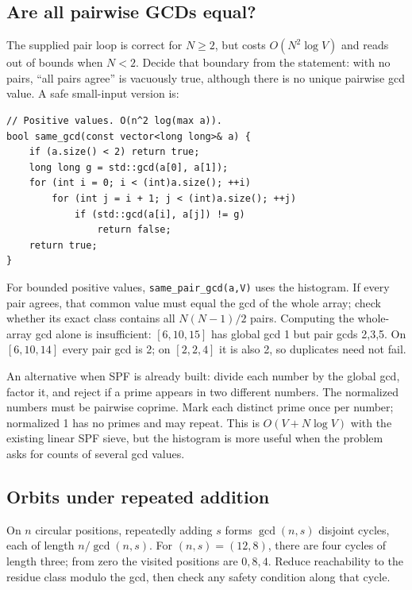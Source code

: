 \subsection{Are all pairwise GCDs equal?}
The supplied pair loop is correct for $N\ge2$, but costs
$O(N^2\log V)$ and reads out of bounds when $N<2$. Decide that boundary
from the statement: with no pairs, ``all pairs agree'' is vacuously true,
although there is no unique pairwise gcd value. A safe small-input version is:
\begin{lstlisting}
// Positive values. O(n^2 log(max a)).
bool same_gcd(const vector<long long>& a) {
    if (a.size() < 2) return true;
    long long g = std::gcd(a[0], a[1]);
    for (int i = 0; i < (int)a.size(); ++i)
        for (int j = i + 1; j < (int)a.size(); ++j)
            if (std::gcd(a[i], a[j]) != g)
                return false;
    return true;
}
\end{lstlisting}
For bounded positive values, \texttt{same\_pair\_gcd(a,V)} uses the
histogram. If every pair agrees, that common value must equal the gcd
of the whole array; check whether its exact class contains all
$N(N-1)/2$ pairs. Computing the whole-array gcd alone is insufficient:
$[6,10,15]$ has global gcd 1 but pair gcds 2,3,5. On $[6,10,14]$ every
pair gcd is 2; on $[2,2,4]$ it is also 2, so duplicates need not fail.

An alternative when SPF is already built: divide each number by the global
gcd, factor it, and reject if a prime appears in two different numbers.
The normalized numbers must be pairwise coprime. Mark each distinct prime
once per number; normalized 1 has no primes and may repeat. This is
$O(V+N\log V)$ with the existing linear SPF sieve, but the histogram is
more useful when the problem asks for counts of several gcd values.

\subsection{Orbits under repeated addition}
On $n$ circular positions, repeatedly adding $s$ forms
$\gcd(n,s)$ disjoint cycles, each of length $n/\gcd(n,s)$. For
$(n,s)=(12,8)$, there are four cycles of length three; from zero the
visited positions are $0,8,4$. Reduce reachability to the residue class
modulo the gcd, then check any safety condition along that cycle.

